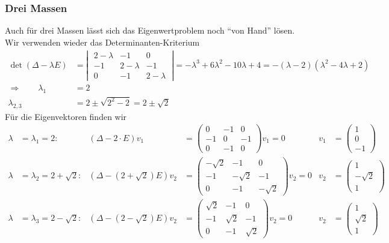 \subsubsection{Drei Massen}
Auch für drei Massen lässt sich das Eigenwertproblem noch
``von Hand'' lösen.
Wir verwenden wieder das Determinanten-Kriterium
\begin{align*}
\det(\Delta -\lambda E)&=\left|\;
\begin{matrix}
2-\lambda&-1&0\\
-1&2-\lambda&-1\\
0&-1&2-\lambda
\end{matrix}
\;\right|
=-\lambda^3+6\lambda^2-10\lambda+4=-(\lambda-2)(\lambda^2-4\lambda+2)
\\
\Rightarrow\qquad
\lambda_1&=2\\
\lambda_{2,3}&=2\pm\sqrt{2^2-2}=2\pm\sqrt{2}
\end{align*}
Für die Eigenvektoren finden wir
\begin{align*}
\lambda&=\lambda_1=2:
&
(\Delta - 2\cdot E)v_1&=\begin{pmatrix}
0&-1&0\\
-1&0&-1\\
0&-1&0\end{pmatrix}v_1
=0&v_1&=\begin{pmatrix}1\\0\\-1\end{pmatrix}
\\
\lambda&=\lambda_2=2+\sqrt{2}:
&
(\Delta -(2+\sqrt{2})E)v_2&=\begin{pmatrix}
-\sqrt{2}&-1&0\\
-1&-\sqrt{2}&-1\\
0&-1&-\sqrt{2}
\end{pmatrix}v_2=0&
v_2&=\begin{pmatrix}
1\\-\sqrt{2}\\1
\end{pmatrix}
\\
\lambda&=\lambda_3=2-\sqrt{2}:
&
(\Delta -(2-\sqrt{2})E)v_2&=\begin{pmatrix}
\sqrt{2}&-1&0\\
-1&\sqrt{2}&-1\\
0&-1&\sqrt{2}
\end{pmatrix}v_2=0&
v_2&=\begin{pmatrix}
1\\\sqrt{2}\\1
\end{pmatrix}
\\
\end{align*}
